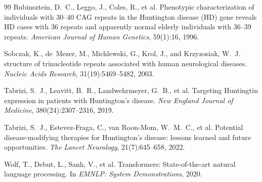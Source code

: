 \documentclass[11pt]{article}
\begin{document}
\begin{thebibliography}{99}
Rubinsztein, D.~C., Leggo, J., Coles, R., et al.
\newblock Phenotypic characterization of individuals with 30--40 {CAG} repeats in the {Huntington} disease ({HD}) gene reveals {HD} cases with 36 repeats and apparently normal elderly individuals with 36--39 repeats.
\newblock \emph{American Journal of Human Genetics}, 59(1):16, 1996.

Sobczak, K., de~Mezer, M., Michlewski, G., Krol, J., and Krzyzosiak, W.~J.
 structure of trinucleotide repeats associated with human neurological diseases.
\newblock \emph{Nucleic Acids Research}, 31(19):5469--5482, 2003.

Tabrizi, S.~J., Leavitt, B.~R., Landwehrmeyer, G.~B., et al.
\newblock Targeting {Huntingtin} expression in patients with {Huntington's} disease.
\newblock \emph{New England Journal of Medicine}, 380(24):2307--2316, 2019.

Tabrizi, S.~J., Estevez-Fraga, C., van Roon-Mom, W.~M.~C., et al.
\newblock Potential disease-modifying therapies for {Huntington's} disease: lessons learned and future opportunities.
\newblock \emph{The Lancet Neurology}, 21(7):645--658, 2022.

Wolf, T., Debut, L., Sanh, V., et al.
\newblock Transformers: State-of-the-art natural language processing.
\newblock In \emph{EMNLP: System Demonstrations}, 2020.

\end{thebibliography}
\end{document}
